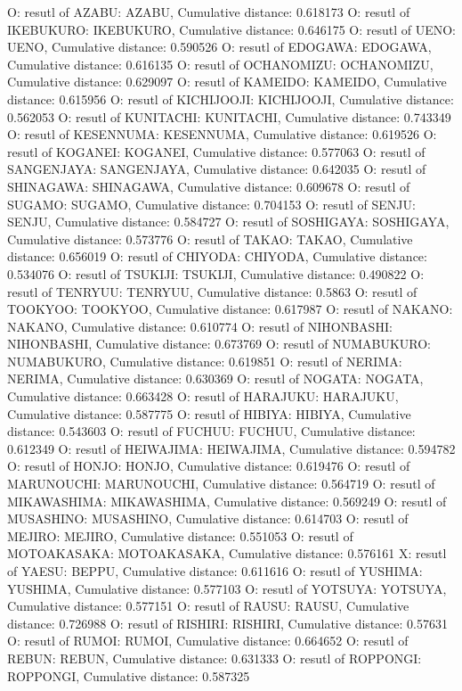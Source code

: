 O: resutl of AZABU: AZABU, Cumulative distance: 0.618173
O: resutl of IKEBUKURO: IKEBUKURO, Cumulative distance: 0.646175
O: resutl of UENO: UENO, Cumulative distance: 0.590526
O: resutl of EDOGAWA: EDOGAWA, Cumulative distance: 0.616135
O: resutl of OCHANOMIZU: OCHANOMIZU, Cumulative distance: 0.629097
O: resutl of KAMEIDO: KAMEIDO, Cumulative distance: 0.615956
O: resutl of KICHIJOOJI: KICHIJOOJI, Cumulative distance: 0.562053
O: resutl of KUNITACHI: KUNITACHI, Cumulative distance: 0.743349
O: resutl of KESENNUMA: KESENNUMA, Cumulative distance: 0.619526
O: resutl of KOGANEI: KOGANEI, Cumulative distance: 0.577063
O: resutl of SANGENJAYA: SANGENJAYA, Cumulative distance: 0.642035
O: resutl of SHINAGAWA: SHINAGAWA, Cumulative distance: 0.609678
O: resutl of SUGAMO: SUGAMO, Cumulative distance: 0.704153
O: resutl of SENJU: SENJU, Cumulative distance: 0.584727
O: resutl of SOSHIGAYA: SOSHIGAYA, Cumulative distance: 0.573776
O: resutl of TAKAO: TAKAO, Cumulative distance: 0.656019
O: resutl of CHIYODA: CHIYODA, Cumulative distance: 0.534076
O: resutl of TSUKIJI: TSUKIJI, Cumulative distance: 0.490822
O: resutl of TENRYUU: TENRYUU, Cumulative distance: 0.5863
O: resutl of TOOKYOO: TOOKYOO, Cumulative distance: 0.617987
O: resutl of NAKANO: NAKANO, Cumulative distance: 0.610774
O: resutl of NIHONBASHI: NIHONBASHI, Cumulative distance: 0.673769
O: resutl of NUMABUKURO: NUMABUKURO, Cumulative distance: 0.619851
O: resutl of NERIMA: NERIMA, Cumulative distance: 0.630369
O: resutl of NOGATA: NOGATA, Cumulative distance: 0.663428
O: resutl of HARAJUKU: HARAJUKU, Cumulative distance: 0.587775
O: resutl of HIBIYA: HIBIYA, Cumulative distance: 0.543603
O: resutl of FUCHUU: FUCHUU, Cumulative distance: 0.612349
O: resutl of HEIWAJIMA: HEIWAJIMA, Cumulative distance: 0.594782
O: resutl of HONJO: HONJO, Cumulative distance: 0.619476
O: resutl of MARUNOUCHI: MARUNOUCHI, Cumulative distance: 0.564719
O: resutl of MIKAWASHIMA: MIKAWASHIMA, Cumulative distance: 0.569249
O: resutl of MUSASHINO: MUSASHINO, Cumulative distance: 0.614703
O: resutl of MEJIRO: MEJIRO, Cumulative distance: 0.551053
O: resutl of MOTOAKASAKA: MOTOAKASAKA, Cumulative distance: 0.576161
X: resutl of YAESU: BEPPU, Cumulative distance: 0.611616
O: resutl of YUSHIMA: YUSHIMA, Cumulative distance: 0.577103
O: resutl of YOTSUYA: YOTSUYA, Cumulative distance: 0.577151
O: resutl of RAUSU: RAUSU, Cumulative distance: 0.726988
O: resutl of RISHIRI: RISHIRI, Cumulative distance: 0.57631
O: resutl of RUMOI: RUMOI, Cumulative distance: 0.664652
O: resutl of REBUN: REBUN, Cumulative distance: 0.631333
O: resutl of ROPPONGI: ROPPONGI, Cumulative distance: 0.587325
